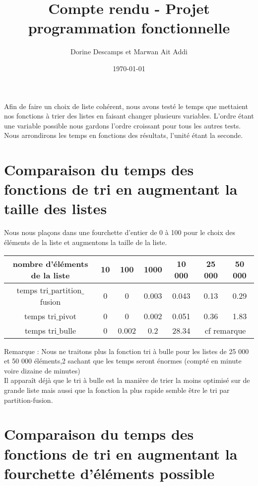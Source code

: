 \documentclass[a4paper, 12pt]{article}
\title{Compte rendu - Projet programmation fonctionnelle}
\author{Dorine Descamps et Marwan Ait Addi}
\date{\today}
\begin{document}
\maketitle
\tableofcontents
\newpage

Afin de faire un choix de liste cohérent, nous avons testé le temps que mettaient nos fonctions à trier des listes en faisant changer plusieurs variables. L'ordre étant une variable possible nous gardons l'ordre croissant pour tous les autres tests. Nous arrondirons les temps en fonctions des résultats, l'unité étant la seconde.

\section{Comparaison du temps des fonctions de tri en augmentant la taille des listes}

Nous nous plaçons dans une fourchette d'entier de 0 à 100 pour le choix des éléments de la liste et augmentons la taille de la liste.
\begin{center}
\begin{tabular}{|c|c|c|c|c|c|c|}
\hline 
nombre d'éléments de la liste & 10 & 100 & 1000 & 10 000 & 25 000 & 50 000 \\ 
\hline 
temps tri$\_$partition$\_$fusion & 0 & 0 & 0.003 & 0.043 & 0.13 & 0.29 \\ 
\hline 
temps tri$\_$pivot & 0 & 0 & 0.002 & 0.051 & 0.36 & 1.83 \\ 
\hline 
temps tri$\_$bulle & 0 & 0.002 & 0.2 & 28.34 & \multicolumn{2}{c|}{cf remarque} \\ 
\hline
\end{tabular}
\end{center} 

Remarque : Nous ne traitons plus la fonction tri à bulle pour les listes de 25 000 et 50 000 éléments,2 sachant que les temps seront énormes (compté en minute voire dizaine de minutes) \\

Il apparaît déjà que le tri à bulle est la manière de trier la moins optimisé sur de grande liste mais aussi que la fonction la plus rapide semble être le tri par partition-fusion.

\section{Comparaison du temps des fonctions de tri en augmentant la fourchette d'éléments possible}
\end{document}
